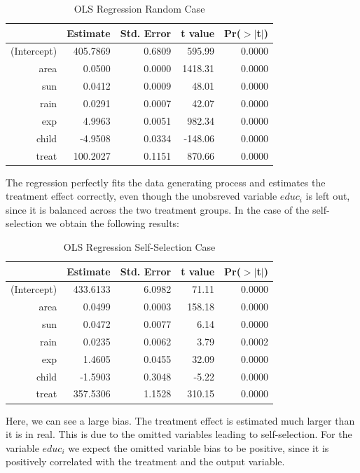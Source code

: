 \begin{enumerate}
\begin{table}[h!]
\centering
\begin{threeparttable}
\caption{OLS Regression Random Case} \label{tab:reg1}
\begin{tabular}{rrrrr}
  \hline
 & Estimate & Std. Error & t value & Pr({$>$}{$|$}t$|$) \\ 
  \hline
(Intercept) & 405.7869 & 0.6809 & 595.99 & 0.0000 \\ 
  area & 0.0500 & 0.0000 & 1418.31 & 0.0000 \\ 
  sun & 0.0412 & 0.0009 & 48.01 & 0.0000 \\ 
  rain & 0.0291 & 0.0007 & 42.07 & 0.0000 \\ 
  exp & 4.9963 & 0.0051 & 982.34 & 0.0000 \\ 
  child & -4.9508 & 0.0334 & -148.06 & 0.0000 \\ 
  treat & 100.2027 & 0.1151 & 870.66 & 0.0000 \\ 
   \hline
\end{tabular}
\end{threeparttable}
\end{table}

The regression perfectly fits the data generating process and estimates the treatment effect correctly, even though the unobsreved variable $\textit{educ}_i$ is left out, since it is balanced across the two treatment groups. In the case of the self-selection we obtain the following results:

\begin{table}[h!]
\centering
\begin{threeparttable}
\caption{OLS Regression Self-Selection Case} \label{tab:reg2}
\begin{tabular}{rrrrr}
  \hline
 & Estimate & Std. Error & t value & Pr({$>$}{$|$}t$|$) \\ 
  \hline
(Intercept) & 433.6133 & 6.0982 & 71.11 & 0.0000 \\ 
  area & 0.0499 & 0.0003 & 158.18 & 0.0000 \\ 
  sun & 0.0472 & 0.0077 & 6.14 & 0.0000 \\ 
  rain & 0.0235 & 0.0062 & 3.79 & 0.0002 \\ 
  exp & 1.4605 & 0.0455 & 32.09 & 0.0000 \\ 
  child & -1.5903 & 0.3048 & -5.22 & 0.0000 \\ 
  treat & 357.5306 & 1.1528 & 310.15 & 0.0000 \\ 
   \hline
\end{tabular}
\end{threeparttable}
\end{table}

Here, we can see a large bias. The treatment effect is estimated much larger than it is in real. This is due to the omitted variables leading to self-selection. For the variable $\textit{educ}_i$ we expect the omitted variable bias to be positive, since it is positively correlated with the treatment and the output variable. 



\end{enumerate}



